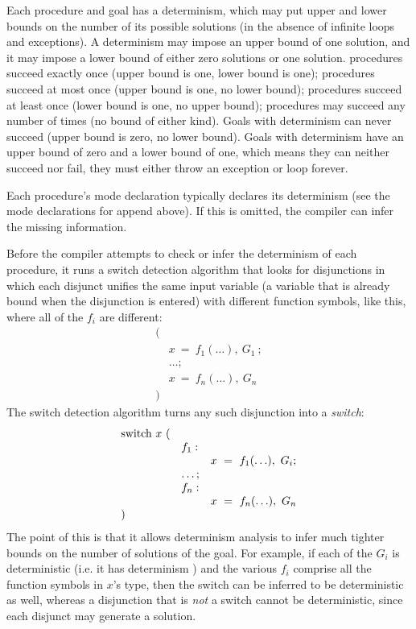 \noindent
Each procedure and goal has a determinism,
which may put upper and lower bounds on the number of its possible solutions
(in the absence of infinite loops and exceptions).
A determinism may impose an upper bound of one solution,
and it may impose a lower bound of either zero solutions or one solution.
 procedures succeed exactly once
(upper bound is one, lower bound is one);
 procedures succeed at most once
(upper bound is one, no lower bound);
 procedures succeed at least once
(lower bound is one, no upper bound);
 procedures may succeed any number of times
(no bound of either kind).
Goals with determinism  can never succeed
(upper bound is zero, no lower bound).
Goals with determinism 
have an upper bound of zero and a lower bound of one,
which means they can neither succeed nor fail,
they must either throw an exception or loop forever.

Each procedure's mode declaration
typically declares its determinism (see the mode declarations for append above).
If this is omitted, the compiler can infer the missing information.

Before the compiler attempts to check or infer
the determinism of each procedure,
it runs a switch detection algorithm that looks for disjunctions
in which each disjunct unifies the same input variable
(a variable that is already bound when the disjunction is entered)
with different function symbols, like this,
where all of the $f_i$ are different:
$$
\begin{array}{ll}
(\\
& x~=~f_1(\ldots),~G_1~; \\
& \ldots; \\
& x~=~f_n(\ldots),~G_n~ \\
)
\end{array}
$$
The switch detection algorithm
turns any such disjunction into a \emph{switch}:
$$
\begin{array}{lll}
\hbox{switch}~x~( \\
& f_1: \\
& & x~=~f_1(\ldots),~G_i; \\
& \ldots; \\
& f_n: \\
& & x~=~f_n(\ldots),~G_n \\
)
\end{array}
$$
The point of this is that it allows determinism analysis
to infer much tighter bounds on the number of solutions of the goal.
For example, if each of the $G_i$ is deterministic
(i.e. it has determinism )
and the various $f_i$ comprise all the function symbols in $x$'s type,
then the switch can be inferred to be deterministic as well,
whereas a disjunction that is \emph{not} a switch cannot be deterministic,
since each disjunct may generate a solution.

